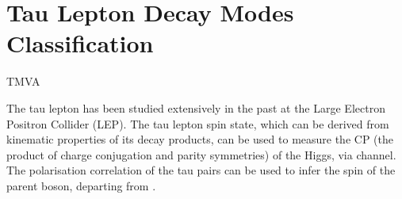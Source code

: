 \chapter{Tau Lepton Decay Modes Classification}
\label{chap:Tau}

%
{TMVA}%

The tau lepton has been studied extensively in the past at the Large Electron Positron Collider (LEP)\cite{Schael:2005am}. The tau lepton spin state, which can be derived from kinematic properties of its decay products, can be used to measure the CP (the product of charge conjugation and parity symmetries) of the Higgs, via \HiggsToTauTau channel\cite{Berge:2015nua}.  The polarisation correlation of the tau pairs can be used to infer the spin of the parent boson, departing \HiggsToTauTau from \ZToTauTau.

